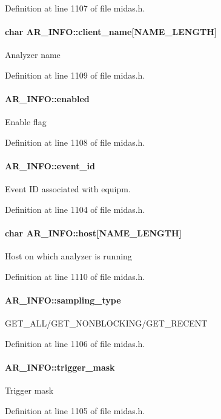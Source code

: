 Definition at line 1107 of file midas.h.
\paragraph[{client\_\-name}]{\setlength{\rightskip}{0pt plus 5cm}char {\bf AR\_\-INFO::client\_\-name}\mbox{[}NAME\_\-LENGTH\mbox{]}}\hfill\label{structAR__INFO_a1331a0c0525a7f42a0f9c23d897cf46c}
Analyzer name 

Definition at line 1109 of file midas.h.
\paragraph[{enabled}]{ {\bf AR\_\-INFO::enabled}}\hfill\label{structAR__INFO_a00b6cb7dc5fefe2d78d04caf3eb257cd}
Enable flag 

Definition at line 1108 of file midas.h.
\paragraph[{event\_\-id}]{ {\bf AR\_\-INFO::event\_\-id}}\hfill\label{structAR__INFO_acb0cf26c5067b0c8eb7a895b70e42f11}
Event ID associated with equipm. 

Definition at line 1104 of file midas.h.
\paragraph[{host}]{\setlength{\rightskip}{0pt plus 5cm}char {\bf AR\_\-INFO::host}\mbox{[}NAME\_\-LENGTH\mbox{]}}\hfill\label{structAR__INFO_ae70ac5ffc29fabfaf9a87e717f75dae0}
Host on which analyzer is running 

Definition at line 1110 of file midas.h.
\paragraph[{sampling\_\-type}]{ {\bf AR\_\-INFO::sampling\_\-type}}\hfill\label{structAR__INFO_a023ac635bfecdb696c795dc7120209b7}
GET\_\-ALL/GET\_\-NONBLOCKING/GET\_\-RECENT 

Definition at line 1106 of file midas.h.
\paragraph[{trigger\_\-mask}]{ {\bf AR\_\-INFO::trigger\_\-mask}}\hfill\label{structAR__INFO_a947c408489c2b8cd8ea2fc8b2df83388}
Trigger mask 

Definition at line 1105 of file midas.h.